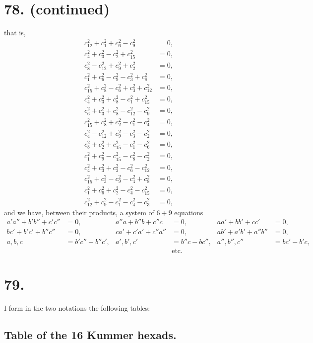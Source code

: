 \documentclass[11pt,a4paper]{article}
\begin{document}
\newpage
\section*{78. (continued)}
\label{sec:78cont}

that is,
\begin{align*}
c_{12}^2 + c_1^2 + c_6^2 - c_9^2 &= 0, \\
c_4^2 + c_3^2 - c_2^2 + c_{15}^2 &= 0, \\
c_8^2 - c_{12}^2 + c_9^2 + c_2^2 &= 0, \\
c_1^2 + c_6^2 - c_9^2 - c_3^2 + c_8^2 &= 0, \\
c_{15}^2 + c_8^2 - c_6^2 + c_3^2 + c_{12}^2 &= 0, \\
c_4^2 + c_3^2 + c_8^2 - c_1^2 + c_{15}^2 &= 0, \\
c_6^2 + c_3^2 + c_8^2 - c_{12}^2 - c_9^2 &= 0, \\
c_{15}^2 + c_8^2 + c_2^2 - c_1^2 - c_4^2 &= 0, \\
c_4^2 - c_{12}^2 + c_9^2 - c_3^2 - c_2^2 &= 0, \\
c_8^2 + c_2^2 + c_{15}^2 - c_1^2 - c_6^2 &= 0, \\
c_1^2 + c_9^2 - c_{15}^2 - c_8^2 - c_2^2 &= 0, \\
c_4^2 + c_3^2 + c_2^2 - c_6^2 - c_{12}^2 &= 0, \\
c_{15}^2 + c_3^2 - c_9^2 - c_4^2 + c_8^2 &= 0, \\
c_1^2 + c_6^2 + c_2^2 - c_4^2 - c_{15}^2 &= 0, \\
c_{12}^2 + c_9^2 - c_1^2 - c_4^2 - c_3^2 &= 0,
\end{align*}
and we have, between their products, a system of $6+9$ equations
\begin{align*}
a'a'' + b'b'' + c'c'' &= 0, & a''a + b''b + c''c &= 0, & aa' + bb' + cc' &= 0, \\
bc' + b'c' + b''c'' &= 0, & ca' + c'a' + c''a'' &= 0, & ab' + a'b' + a''b'' &= 0, \\
a,b,c &= b'c'' - b''c', & a',b',c' &= b''c - bc'', & a'',b'',c'' &= bc' - b'c, \\
& & & \text{etc.}
\end{align*}

\newpage
\section*{79.}
\label{sec:79}

I form in the two notations the following tables:

\subsection*{Table of the 16 Kummer hexads.}
\end{document}
